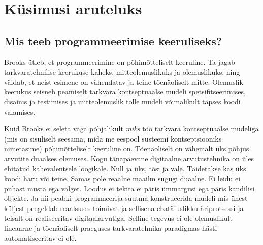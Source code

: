 \documentclass{tufte-book}
\begin{document}
\section{Küsimusi aruteluks}
\subsection{Mis teeb programmeerimise keeruliseks?}

Brooks ütleb, et programmeerimine on põhimõtteliselt keeruline\cite{brooks1975mythical}. Ta jagab tarkvaratehnilise keerukuse kaheks, mitteolemuslikuks ja olemuslikuks, ning väidab, et neist esimene on vähendatav ja teine tõenäoliselt mitte. Olemuslik keerukus seisneb peamiselt tarkvara kontseptuaalse mudeli spetsifitseerimises, disainis ja testimises ja mitteolemuslik tolle mudeli võimalikult täpses koodi valamises. 

Kuid Brooks ei seleta väga põhjalikult \emph{miks} töö tarkvara kontseptuaalse mudeliga (mis on sisuliselt seesama, mida me eespool süsteemi kontseptsiooniks nimetasime) põhimõtteliselt keeruline on. Tõenäoliselt on vähemalt üks põhjus arvutite duaalses olemuses. Kogu tänapäevane digitaalne arvutustehnika on üles ehitatud kahevalentsele loogikale. Null ja üks, tõsi ja vale. Täidetakse kas üks koodi haru või teine. Samas pole reaalne maailm sugugi duaalne. Ei leidu ei puhast musta ega valget. Loodus ei tekita ei päris ümmargusi ega päris kandilisi objekte. Ja nii peabki programmeerija suutma konstrueerida mudeli mis ühest küljest peegeldab reaalsuses toimivat ja sellisena ebatäiuslikku äriprotsessi ja teisalt on realiseeritav digitaalarvutiga. Selline tegevus ei ole olemuslikult lineaarne ja tõenäoliselt praeguses tarkvaratehnika paradigmas hästi automatiseeritav ei ole. 
\end{document}
